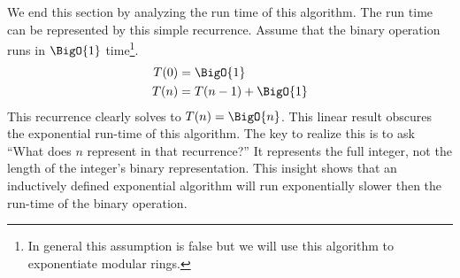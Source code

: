 \documentclass[./Thesis.tex]{subfiles}
\begin{document}
We end this section by analyzing the run time of this algorithm. The run time
can be represented by this simple recurrence. Assume that the binary operation
runs in $\BigO{1}$ time\footnote
{In general this assumption is false but we
  will use this algorithm to exponentiate modular rings.
}.
\begin{align}
  \label{eqn:slow-recurrence}
  \begin{split}
    T(0) &= \BigO{1} \\
    T(n) &= T(n - 1) + \BigO{1}
  \end{split}
\end{align}
This recurrence clearly solves to $T(n) = \BigO{n}$. This linear result obscures
the exponential run-time of this algorithm. The key to realize this is to ask
``What does $n$ represent in that recurrence?'' It represents the full integer, not
the length of the integer's binary representation. This insight shows that an inductively
defined exponential algorithm will run exponentially slower then the run-time of the
binary operation.
\end{document}
